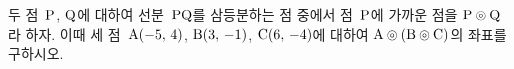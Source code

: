 두 점~$\mathrm{P}$, $\mathrm{Q}$에 대하여 선분~$\mathrm{PQ}$를 삼등분하는 점 중에서 점~$\mathrm{P}$에 가까운 점을 $\mathrm{P}\circledcirc\mathrm{Q}$라 하자. 이때 세 점~$\mathrm{A}(-5,\,4)$, $\mathrm{B}(3,\,-1)$, $\mathrm{C}(6,\,-4)$에 대하여 $\mathrm{A}\circledcirc(\mathrm{B}\circledcirc\mathrm{C})$의 좌표를 구하시오.
